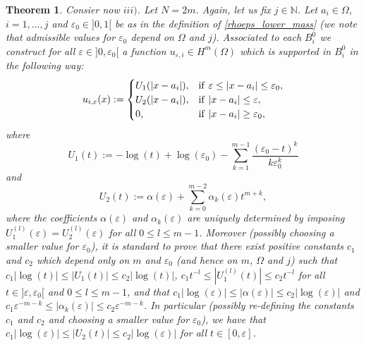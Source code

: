 \documentclass[11pt,a4paper]{amsart}
\numberwithin{equation}{section}
\newtheorem{thm}[equation]{Theorem}
\begin{document}
\begin{thm}
Consier now $iii)$. Let $N=2m$. Again, let us fix $j\in\mathbb N$. Let $a_i\in\Omega$, $i=1,...,j$ and $\varepsilon_0\in]0,1[$ be as in the definition of \eqref{rhoeps_lower_mass} (we note that admissible values for $\varepsilon_0$ depend on $\Omega$ and $j$). Associated to each $B_i^0$ we construct for all $\varepsilon\in]0,\varepsilon_0[$ a function $u_{\varepsilon,i}\in H^m(\Omega)$ which is supported in $B_i^0$  in the following way:
\begin{equation*}
u_{i,\varepsilon}(x):=
\begin{cases}
U_1(|x-a_i|), & {\rm if\ } \varepsilon\leq |x-a_i| \leq \varepsilon_0,\\
U_2(|x-a_i|), & {\rm if\ } |x-a_i|\leq\varepsilon,\\
0, & {\rm if\ } |x-a_i|\geq\varepsilon_0,
\end{cases}
\end{equation*}
where
\begin{equation*}
U_1(t):=-\log(t)+\log(\varepsilon_0)-\sum_{k=1}^{m-1}\frac{(\varepsilon_0-t)^k}{k\varepsilon_0^k}
\end{equation*}
and
\begin{equation*}
U_2(t):=\alpha(\varepsilon)+\sum_{k=0}^{m-2}\alpha_{k}(\varepsilon)t^{m+k},
\end{equation*}
where the coefficients $\alpha(\varepsilon)$ and $\alpha_k(\varepsilon)$ are uniquely determined by imposing $U_1^{(l)}(\varepsilon)=U_2^{(l)}(\varepsilon)$ for all $0\leq l\leq m-1$. Moreover (possibly choosing a smaller value for $\varepsilon_0$), it is standard to prove that there exist positive constants $c_1$ and $c_2$ which depend only on $m$ and $\varepsilon_0$ (and hence on $m$, $\Omega$ and $j$) such that $c_1|\log(t)|\leq|U_1(t)|\leq c_2|\log(t)|$, $c_1t^{-l}\leq|U_1^{(l)}(t)|\leq c_2t^{-l}$ for all $t\in]\varepsilon,\varepsilon_0[$ and $0\leq l\leq m-1$, and that $c_1|\log(\varepsilon)|\leq|\alpha(\varepsilon)|\leq c_2|\log(\varepsilon)|$ and $c_1\varepsilon^{-m-k}\leq|\alpha_k(\varepsilon)|\leq c_2\varepsilon^{-m-k}$. In particular (possibly re-defining the constants $c_1$ and $c_2$ and choosing a smaller value for $\varepsilon_0$), we have that $c_1|\log(\varepsilon)|\leq|U_2(t)|\leq c_2|\log(\varepsilon)|$ for all $t\in[0,\varepsilon]$.


\end{thm}
\end{document}
